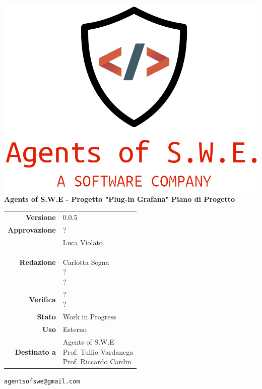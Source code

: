 

\usepackage{graphicx}



\begin{titlepage}
\thispagestyle{empty}

\begin{center}
\includegraphics[scale=0.3]{./images/logo.png}\\
\large \textbf{Agents of S.W.E - Progetto "Plug-in Grafana"}
\vfill
\Huge \textbf{Piano di Progetto}
\vfill
\large
\renewcommand{\arraystretch}{1.3}
\begin{tabular}{r|l}


\textbf{Versione} & 0.0.5\\
\textbf{Approvazione} & ?\\
\textbf{Redazione} & \parbox[t]{5cm}{Luca Violato\\\\Carlotta Segna\\?\\?}\\
\textbf{Verifica} & \parbox[t]{5cm}{?\\?}\\
\textbf{Stato} & Work in Progress\\
\textbf{Uso} & Esterno\\
\textbf{Destinato a} & \parbox[t]{5cm}{Agents of S.W.E \\Prof. Tullio Vardanega\\Prof. Riccardo Cardin}
\end{tabular}
\vfill
\small
\texttt{agentsofswe@gmail.com}
\end{center}
\end{titlepage}

